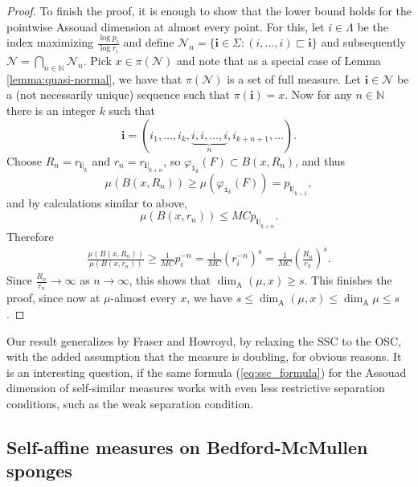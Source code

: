 \documentclass{PRM}
\newcommand{\field}[1]{\mathbb{#1}}
\newcommand{\N}{\field{N}}
\newcommand{\smalli}{\mathtt{i}}
\newcommand{\adim}{\dim_{\mathrm{A}}}
\theoremstyle{plain}
\theoremstyle{definition}
\theoremstyle{remark}
\begin{document}
\begin{proof}
To finish the proof, it is enough to show that the lower bound holds for the pointwise Assouad dimension at almost every point. For this, let $i\in\Lambda$ be the index maximizing $\frac{\log p_i}{\log r_i}$ and define $\mathcal{N}_n=\{\mathbf{i}\in\Sigma\colon (i,\ldots,i)\sqsubset \mathbf{i}\}$ and subsequently $\mathcal{N}=\bigcap_{n\in\N}\mathcal{N}_n$. Pick $x\in \pi(\mathcal{N})$ and note that as a special case of Lemma \ref{lemma:quasi-normal}, we have that $\pi(\mathcal{N})$ is a set of full measure. Let $\mathbf{i}\in \mathcal{N}$ be a (not necessarily unique) sequence such that $\pi(\mathbf{i})=x$. Now for any $n\in\N$ there is an integer $k$ such that
\begin{equation*}
    \mathbf{i}=(i_1,\ldots,i_k,\underbrace{i,i,\ldots,i}_n,i_{k+n+1},\ldots).
\end{equation*}
Choose $R_n = r_{\mathbf{i}|_{k}}$ and $r_n=r_{\mathbf{i}|_{k+n}}$, so $\varphi_{\smalli_{k}}(F)\subset B(x,R_n)$, and thus
\begin{equation*}
    \mu(B(x,R_n))\geq\mu(\varphi_{\smalli_{k}}(F))=p_{\mathbf{i}|_{k-1}},
\end{equation*}
and by calculations similar to above,
\begin{equation*}
    \mu(B(x,r_n))\leq MC p_{\mathbf{i}|_{k+n}}.
\end{equation*}
Therefore
\begin{align*}
    \frac{\mu(B(x,R_n))}{\mu(B(x,r_n))}\geq \frac{1}{MC}p_i^{-n}=\frac{1}{MC}(r_i^{-n})^{s}= \frac{1}{MC}\left(\frac{R_n}{r_n}\right)^{s}.
\end{align*}
Since $\frac{R_n}{r_n}\to\infty$ as $n\to \infty$, this shows that $\dim_{\mathrm{A}}(\mu,x)\geq s$. This finishes the proof, since now at $\mu$-almost every $x$, we have $s\leq \adim(\mu,x)\leq \adim\mu\leq s$.
\end{proof}

Our result generalizes \cite[Theorem 2.4]{FH} by Fraser and Howroyd, by relaxing the SSC to the OSC, with the added assumption that the measure is doubling, for obvious reasons. It is an interesting question, if the same formula (\ref{eq:ssc_formula}) for the Assouad dimension of self-similar measures works with even less restrictive separation conditions, such as the weak separation condition.

\subsection{Self-affine measures on Bedford-McMullen sponges}
\end{document}
